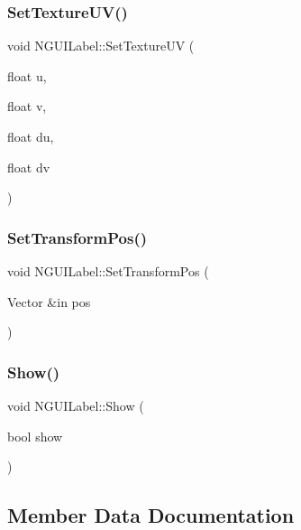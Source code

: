 \subsubsection{\texorpdfstring{Set\+Texture\+U\+V()}{SetTextureUV()}}
{\footnotesize\ttfamily void N\+G\+U\+I\+Label\+::\+Set\+Texture\+UV (\begin{DoxyParamCaption}\item[{float}]{u,  }\item[{float}]{v,  }\item[{float}]{du,  }\item[{float}]{dv }\end{DoxyParamCaption})}

\hypertarget{class_n_g_u_i_label_ac4907f8e5a3298c35291d4e1e2be2cde}{}\label{class_n_g_u_i_label_ac4907f8e5a3298c35291d4e1e2be2cde} 
\subsubsection{\texorpdfstring{Set\+Transform\+Pos()}{SetTransformPos()}}
{\footnotesize\ttfamily void N\+G\+U\+I\+Label\+::\+Set\+Transform\+Pos (\begin{DoxyParamCaption}\item[{Vector \&in}]{pos }\end{DoxyParamCaption})}

\hypertarget{class_n_g_u_i_label_af15768407f2f219c0087c1c366ec62bf}{}\label{class_n_g_u_i_label_af15768407f2f219c0087c1c366ec62bf} 
\subsubsection{\texorpdfstring{Show()}{Show()}}
{\footnotesize\ttfamily void N\+G\+U\+I\+Label\+::\+Show (\begin{DoxyParamCaption}\item[{bool}]{show }\end{DoxyParamCaption})}



\subsection{Member Data Documentation}
\hypertarget{class_n_g_u_i_label_abe5aec3bceca1daf9512ba6140a7c57b}{}\label{class_n_g_u_i_label_abe5aec3bceca1daf9512ba6140a7c57b} 
